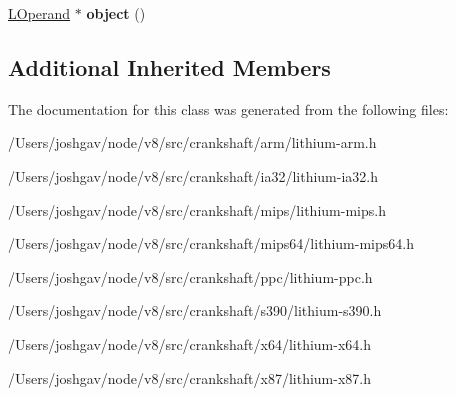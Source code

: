 \begin{DoxyCompactItemize}
\item 
\hyperlink{classv8_1_1internal_1_1_l_operand}{L\+Operand} $\ast$ {\bfseries object} ()\hypertarget{classv8_1_1internal_1_1_l_cmp_hole_and_branch_a88bba51251d180ae5754814169f53168}{}\label{classv8_1_1internal_1_1_l_cmp_hole_and_branch_a88bba51251d180ae5754814169f53168}

\end{DoxyCompactItemize}
\subsection*{Additional Inherited Members}


The documentation for this class was generated from the following files\+:\begin{DoxyCompactItemize}
\item 
/\+Users/joshgav/node/v8/src/crankshaft/arm/lithium-\/arm.\+h\item 
/\+Users/joshgav/node/v8/src/crankshaft/ia32/lithium-\/ia32.\+h\item 
/\+Users/joshgav/node/v8/src/crankshaft/mips/lithium-\/mips.\+h\item 
/\+Users/joshgav/node/v8/src/crankshaft/mips64/lithium-\/mips64.\+h\item 
/\+Users/joshgav/node/v8/src/crankshaft/ppc/lithium-\/ppc.\+h\item 
/\+Users/joshgav/node/v8/src/crankshaft/s390/lithium-\/s390.\+h\item 
/\+Users/joshgav/node/v8/src/crankshaft/x64/lithium-\/x64.\+h\item 
/\+Users/joshgav/node/v8/src/crankshaft/x87/lithium-\/x87.\+h\end{DoxyCompactItemize}
